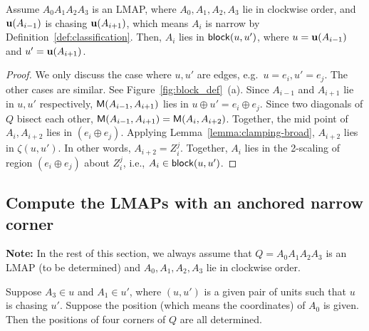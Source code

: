 \documentclass{ws-ijcga}
\begin{document}
\begin{lemma}\label{lemma:transformed}
Assume $A_0A_1A_2A_3$ is an LMAP, where $A_0,A_1,A_2,A_3$ lie in clockwise order, and $\mathbf{u}(A_{i-1})$ is chasing $\mathbf{u}(A_{i+1})$,
which means $A_i$ is narrow by Definition~\ref{def:classification}.
Then, $A_i$ lies in $\mathsf{block}(u,u')$, where $u=\mathbf{u}(A_{i-1})$ and $u'=\mathbf{u}(A_{i+1})$.
\end{lemma}
\begin{proof}
We only discuss the case where $u,u'$ are edges, e.g.\ $u=e_i,u'=e_j$. The other cases are similar.
See Figure~\ref{fig:block_def}~(a).
Since $A_{i-1}$ and $A_{i+1}$ lie in $u,u'$ respectively, $\mathsf{M}(A_{i-1},A_{i+1})$ lies in $u\oplus u'= e_i\oplus e_j$.
Since two diagonals of $Q$ bisect each other, $\mathsf{M}(A_{i-1},A_{i+1})=\mathsf{M}(A_i,A_{i+2})$.
Together, the mid point of $A_i,A_{i+2}$ lies in $(e_i\oplus e_j)$.
Applying Lemma~\ref{lemma:clamping-broad}, $A_{i+2}$ lies in $\zeta(u,u')$.
In other words, $A_{i+2}=Z_i^j$.
Together, $A_i$ lies in the 2-scaling of region $(e_i\oplus e_j)$ about $Z_i^j$,
i.e., $A_i\in \mathsf{block}(u,u')$.
 \end{proof}

\subsection{Compute the LMAPs with an anchored narrow corner}

\textbf{Note:} In the rest of this section, we always assume that $Q=A_0A_1A_2A_3$ is an LMAP (to be determined)
 and $A_0,A_1,A_2,A_3$ lie in clockwise order.

\begin{claim}\label{claim:N}
Suppose $A_3\in u$ and $A_1\in u'$, where $(u,u')$ is a given pair of units such that $u$ is chasing $u'$.
Suppose the position (which means the coordinates) of $A_0$ is given.
Then the positions of four corners of $Q$ are all determined.
\end{claim}
\end{document}
